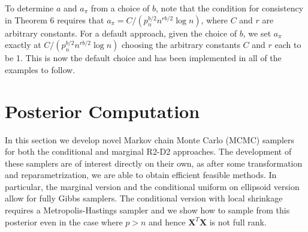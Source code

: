\documentclass[12pt]{article}
\newcommand{\X}{{\bm  X}}
\begin{document}
To determine $a$ and $a_\pi$ from a choice of $b$, note that the condition for consistency in Theorem 6 requires that $a_\pi=C/(p_n^{b/2}n^{r b/2} \log n)$, where $C$ and $r$ are arbitrary constants. For a default approach, given the choice of $b$, we set $a_\pi$ exactly at $C/(p_n^{b/2}n^{r b/2} \log n)$ choosing the arbitrary constants $C$ and $r$ each to be 1. This is now the default choice and has been implemented in all of the examples to follow.


\section{Posterior Computation}\label{post.comp}
In this section we develop novel Markov chain Monte Carlo (MCMC) samplers for both the conditional and marginal R2-D2 approaches. The development of these samplers are of interest directly on their own, as after some  transformation and reparametrization, we are able to obtain efficient feasible methods. In particular, the marginal version and the conditional uniform on ellipsoid version allow for fully Gibbs samplers. The conditional version with local shrinkage requires a Metropolis-Hastings sampler and we show how to sample from this posterior even in the case where $p > n$ and hence $\X^T\X$ is not full rank.

\end{document}
